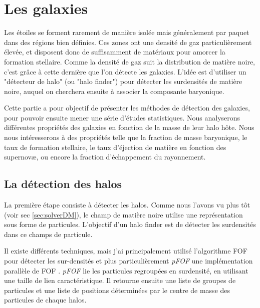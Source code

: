 \chapter{Les galaxies}
\label{sec:galaxies}

Les étoiles se forment rarement de manière isolée mais généralement par paquet dans des régions bien définies.%
Ces zones ont une densité de gaz particulièrement élevée, et disposent donc de suffisamment de matériaux pour amorcer la formation stellaire.
Comme la densité de gaz suit la distribution de matière noire, c'est grâce à cette dernière que l'on détecte les galaxies.
L'idée est d'utiliser un "détecteur de halo" (ou "halo finder") pour détecter les surdensités de matière noire, auquel on cherchera ensuite à associer la composante baryonique.

Cette partie a pour objectif de présenter les méthodes de détection des galaxies, pour pouvoir ensuite mener une série d'études statistiques.
Nous analyserons différentes propriétés des galaxies en fonction de la masse de leur halo hôte.
Nous nous intéresserons à des propriétés telle que la fraction de masse baryonique, le taux de formation stellaire, le taux d'éjection de matière en fonction des supernovæ, ou encore la fraction d'échappement du rayonnement.


\section{La détection des halos}
La première étape consiste à détecter les halos.
Comme nous l'avons vu plus tôt (voir sec \ref{sec:solverDM}), le champ de matière noire utilise une représentation sous forme de particules.
L'objectif d'un halo finder est de détecter les surdensités dans ce champs de particule.


Il existe différents techniques, mais j'ai principalement utilisé l’algorithme \ac{FOF} pour détecter les sur-densités et plus particulièrement \textit{pFOF} une implémentation parallèle de \ac{FOF} \citep{2014A&A...564A..13R}.
\textit{pFOF} lie les particules regroupées en surdensité, en utilisant une taille de lien caractéristique.
Il retourne ensuite une liste de groupes de particules et une liste de positions déterminées par le centre de masse des particules de chaque halos.

